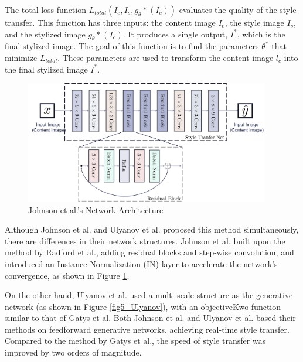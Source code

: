 \documentclass[preprint,12pt]{elsarticle}
\begin{document}
The total loss function $L_{total}\left(I_c,I_s,g_\theta*(I_c)\right)$ evaluates the quality of the style transfer. This function has three inputs: the content image $I_c$, the style image $I_s$, and the stylized image $g_\theta*(I_c)$. It produces a single output, $I^*$, which is the final stylized image. The goal of this function is to find the parameters $\theta^*$ that minimize $L_{total}$. These parameters are used to transform the content image $l_c$ into the final stylized image $I^*$.
\begin{figure}[!htbp]%
    \centering%
    \includegraphics[width=0.95\textwidth]{Figure_4__Johnson_et_al_Network_Architecture.pdf}
    \caption{Johnson et al.'s Network Architecture \citep{22johnson2016perceptual}}\label{fig4_Johnson}
\end{figure}

Although Johnson et al. and Ulyanov et al. proposed this method simultaneously, there are differences in their network structures. Johnson\citep{22johnson2016perceptual} et al. built upon the method by Radford et al.\citep{34radford2015unsupervised}, adding residual blocks and step-wise convolution, and introduced an Instance Normalization (IN) layer to accelerate the network's convergence, as shown in Figure \ref{fig4_Johnson}.


On the other hand, Ulyanov et al.\citep{23ulyanov2016texture} used a multi-scale structure as the generative network (as shown in Figure \ref{fig5_Ulyanov}), with an objectiveKwo function similar to that of Gatys et al.\citep{02gatys2016image} Both Johnson et al. and Ulyanov et al. based their methods on feedforward generative networks, achieving real-time style transfer. Compared to the method by Gatys et al.\citep{02gatys2016image}, the speed of style transfer was improved by two orders of magnitude.
\end{document}
